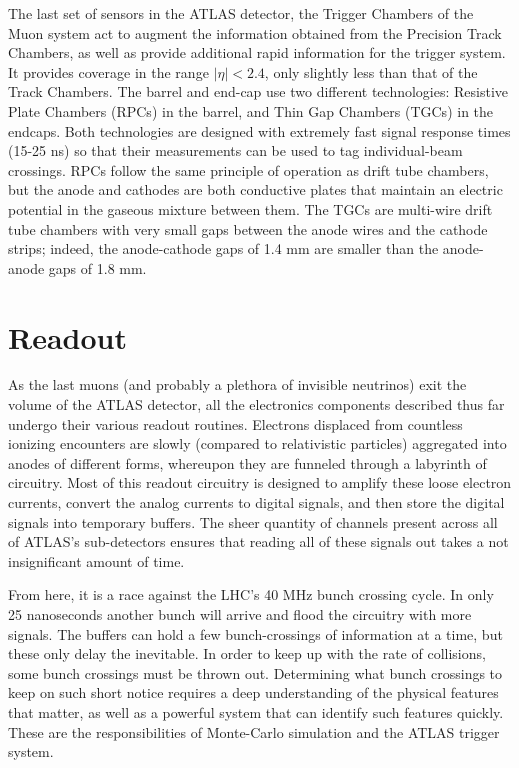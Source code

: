         The last set of sensors in the ATLAS detector, the Trigger Chambers of the Muon system act to augment the information obtained from the Precision Track Chambers, as well as provide additional rapid information for the trigger system.
        It provides coverage in the range $|\eta| < 2.4$, only slightly less than that of the Track Chambers.
        The barrel and end-cap use two different technologies:
            Resistive Plate Chambers (RPCs) in the barrel, and Thin Gap Chambers (TGCs) in the endcaps.
        Both technologies are designed with extremely fast signal response times (15-25 ns) so that their measurements can be used to tag individual-beam crossings.
        RPCs follow the same principle of operation as drift tube chambers, but the anode and cathodes are both conductive plates that maintain an electric potential in the gaseous mixture between them.
        The TGCs are multi-wire drift tube chambers with very small gaps between the anode wires and the cathode strips;
            indeed, the anode-cathode gaps of 1.4 mm are smaller than the anode-anode gaps of 1.8 mm.

    

    \FloatBarrier
\section{Readout}

    As the last muons (and probably a plethora of invisible neutrinos) exit the volume of the ATLAS detector,
        all the electronics components described thus far undergo their various readout routines.
    Electrons displaced from countless ionizing encounters are slowly (compared to relativistic particles)
        aggregated into anodes of different forms,
        whereupon they are funneled through a labyrinth of circuitry.
    Most of this readout circuitry is designed to amplify these loose electron currents,
        convert the analog currents to digital signals,
        and then store the digital signals into temporary buffers.
    The sheer quantity of channels present across all of ATLAS's sub-detectors ensures that
        reading all of these signals out takes a not insignificant amount of time.

    From here, it is a race against the LHC's 40 MHz bunch crossing cycle.
    In only 25 nanoseconds another bunch will arrive and flood the circuitry with more signals.
    The buffers can hold a few bunch-crossings of information at a time, but these only delay the inevitable.
    In order to keep up with the rate of collisions, some bunch crossings must be thrown out.
    Determining what bunch crossings to keep on such short notice
        requires a deep understanding of the physical features that matter,
        as well as a powerful system that can identify such features quickly.
    These are the responsibilities of Monte-Carlo simulation and the ATLAS trigger system. 


